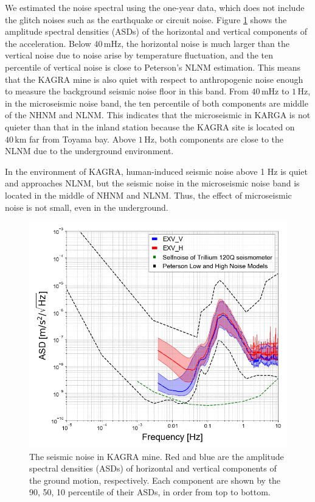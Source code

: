 We estimated the noise spectral using the one-year data, which does not include the glitch noises such as the earthquake or circuit noise. Figure \ref{img:img313} shows the amplitude spectral densities (ASDs) of the horizontal and vertical components of the acceleration. Below $40\,\mathrm{mHz}$, the horizontal noise is much larger than the vertical noise due to noise arise by temperature fluctuation, and the ten percentile of vertical noise is close to Peterson's NLNM estimation. This means that the KAGRA mine is also quiet with respect to anthropogenic noise enough to measure the background seismic noise floor in this band. From $40\,\mathrm{mHz}$ to $1\,\mathrm{Hz}$, in the microseismic noise band, the ten percentile of both components are middle of the NHNM and NLNM. This indicates that the microseismic in KARGA is not quieter than that in the inland station because the KAGRA site is located on $40\,\mathrm{km}$ far from Toyama bay. Above $1\,\mathrm{Hz}$, both components are close to the NLNM due to the underground environment.

In the environment of KAGRA, human-induced seismic noise above 1 Hz is quiet and approaches NLNM, but the seismic noise in the microseismic noise band is located in the middle of NHNM and NLNM. Thus, the effect of microseismic noise is not small, even in the underground.


\begin{figure}[h]
  \includegraphics[width=13.0cm]{./img_chap3/img313.png}
  \caption{ The seismic noise in KAGRA mine. Red and blue are the amplitude spectral densities (ASDs) of horizontal and vertical components of the ground motion, respectively. Each component are shown by the 90, 50, 10 percentile of their ASDs, in order from top to bottom.}\label{img:img313}
\end{figure}


